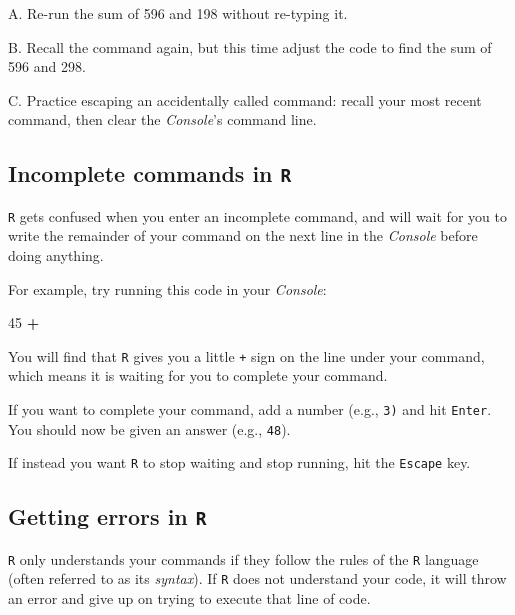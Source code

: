 \documentclass[
]{book}
\newenvironment{Shaded}{\begin{snugshade}}{\end{snugshade}}
\newcommand{\DecValTok}[1]{\textcolor[rgb]{0.00,0.00,0.81}{#1}}
\newcommand{\OperatorTok}[1]{\textcolor[rgb]{0.81,0.36,0.00}{\textbf{#1}}}
\begin{document}
A. Re-run the sum of 596 and 198 without re-typing it.

B. Recall the command again, but this time adjust the code to find the sum of 596 and 298.

C. Practice escaping an accidentally called command: recall your most recent command, then clear the \emph{Console}'s command line.

\hypertarget{incomplete-commands-in-r}{%
\subsection*{\texorpdfstring{Incomplete commands in \texttt{R}}{Incomplete commands in R}}\label{incomplete-commands-in-r}}

\texttt{R} gets confused when you enter an incomplete command, and will wait for you to write the remainder of your command on the next line in the \emph{Console} before doing anything.

For example, try running this code in your \emph{Console}:

\begin{Shaded}
\begin{Highlighting}[]
\DecValTok{45} \OperatorTok{+}
\end{Highlighting}
\end{Shaded}

You will find that \texttt{R} gives you a little \texttt{+} sign on the line under your command, which means it is waiting for you to complete your command.

If you want to complete your command, add a number (e.g., \texttt{3)} and hit \texttt{Enter}. You should now be given an answer (e.g., \texttt{48}).

If instead you want \texttt{R} to stop waiting and stop running, hit the \texttt{Escape} key.

\hypertarget{getting-errors-in-r}{%
\subsection*{\texorpdfstring{Getting errors in \texttt{R}}{Getting errors in R}}\label{getting-errors-in-r}}

\texttt{R} only understands your commands if they follow the rules of the \texttt{R} language (often referred to as its \emph{syntax}). If \texttt{R} does not understand your code, it will throw an error and give up on trying to execute that line of code.
\end{document}

